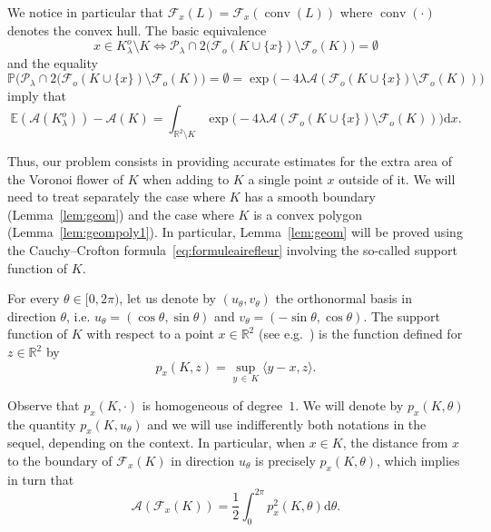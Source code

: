 \documentclass[AHL,Unicode,longabstracts,published]{cedram}
\DeclareMathOperator{\conv}{conv}
\newcommand{\cA}{\mathcal{A}}
\newcommand{\cF}{\mathcal{F}}
\newcommand{\cP}{\mathcal{P}}
\newcommand{\dd}{\mathrm{d}}
\newcommand{\E}{\mathbb{E}}
\renewcommand{\P}{\mathbb{P}}
\newcommand{\R}{\mathbb{R}}
\newcommand{\pass}{\vspace{0.3cm}\noindent}
\newcommand{\noi}{\noindent}
\newcommand{\R}{\mathbb{R}}
\begin{document}
We notice in particular that $\cF_x(L)=\cF_x(\conv(L))$ where $\conv(\cdot)$ denotes the convex hull. The basic equivalence
\begin{equation*}\label{eq:loipoissfleur}
x\in K_{\lambda}^o\setminus K \Longleftrightarrow \cP_{\lambda}\cap 2\big(\cF_o(K\cup \{x\})\setminus \cF_o(K)\big)=\emptyset
\end{equation*}
and the equality
\begin{equation}\label{eq:emptycap}
\P\big(\cP_{\lambda}\cap 2(\cF_o(K\cup \{x\})\setminus \cF_o(K)\big) = \emptyset = \exp\big(-4\lambda\cA(\cF_o(K \cup \{x\})\setminus\cF_o(K))\big)
\end{equation}
imply that
\begin{equation}\label{eq:airesmooth}
\E(\cA(K_{\lambda}^o))-\cA(K) = \int_{\R^2\setminus K} \exp\big(-4\lambda\cA(\cF_o(K \cup \{x\})\setminus\cF_o(K))\big)\dd x.
\end{equation}

Thus, our problem consists in providing accurate estimates for the extra area of the Voronoi flower of $K$ when adding to $K$ a single point $x$ outside of it. We will need to treat separately the case where $K$ has a smooth boundary (Lemma~\ref{lem:geom}) and the case where $K$ is a convex polygon (Lemma~\ref{lem:geompoly1}). In particular, Lemma~\ref{lem:geom} will be proved using the Cauchy--Crofton formula~\eqref{eq:formuleairefleur} involving the so-called support function of $K$.

For every $\theta\in [0,2\pi)$, let us denote by $(u_{\theta},v_{\theta})$ the orthonormal basis in direction $\theta$, i.e. $u_{\theta}=(\cos\theta,\sin\theta)$ and $v_{\theta}=(-\sin\theta,\cos\theta)$. The support function of $K$ with respect to a point $x\in\R^2$ (see e.g.~\cite[Section~1.7]{Schneider}) is the function defined for $z\in\R^2$ by
\begin{equation*}\label{def:suppfunc}
p_x(K,z) = \sup_{y\,\in\,K}\langle y-x,z\rangle.
\end{equation*}

Observe that $p_x(K,\cdot)$ is homogeneous of degree~$1$. We will denote by $p_x(K,\theta)$ the quantity $p_x(K,u_\theta)$ and we will use indifferently both notations in the sequel, depending on the context. In particular, when $x\in K$, the distance from $x$ to the boundary of $\cF_x(K)$ in direction $u_{\theta}$ is precisely $p_{x}(K,\theta)$, which implies in turn that
\begin{equation}\label{eq:formuleairefleur}
\cA(\cF_x(K))=\frac1{2}\int_0^{2\pi}p^2_x(K,\theta)\dd \theta.
\end{equation}
\end{document}
